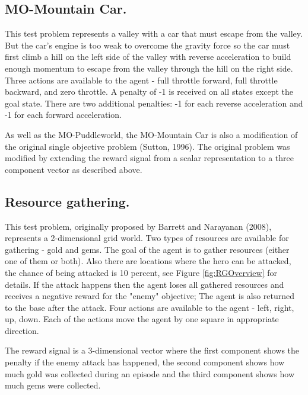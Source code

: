 \subsection{MO-Mountain Car.}
\label{sec:mo-mountain-car}
This test problem represents a valley with a car that must escape from the valley. But the car's engine is too weak to overcome the gravity force so the car must first climb a hill on the left side of the valley with reverse acceleration to build enough momentum to escape from the valley through the hill on the right side. Three actions are available to the agent - full throttle forward, full throttle backward, and zero throttle. A penalty of -1 is received on all states except the goal state. There are two additional penalties: -1 for each reverse acceleration and -1 for each forward acceleration.

As well as the MO-Puddleworld, the MO-Mountain Car is also a modification of the original single objective problem (Sutton, 1996\nocite{sutton1996generalization}). The original problem was modified by extending the reward signal from a scalar representation to a three component vector as described above.

\subsection{Resource gathering.}
\label{sec:resource-gathering}
This test problem, originally proposed by Barrett and Narayanan (2008)\nocite{barrett2008learning}, represents a 2-dimensional grid world. Two types of resources are available for gathering - gold and gems. The goal of the agent is to gather resources (either one of them or both). Also there are locations where the hero can be attacked, the chance of being attacked is 10 percent, see Figure \ref{fig:RGOverview} for details. If the attack happens then the agent loses all gathered resources and receives a negative reward for the "enemy" objective; The agent is also returned to the base after the attack. Four actions are available to the agent - left, right, up, down. Each of the actions move the agent by one square in appropriate direction.

The reward signal is a 3-dimensional vector where the first component shows the penalty if the enemy attack has happened, the second component shows how much gold was collected during an episode and the third component shows how much gems were collected.


